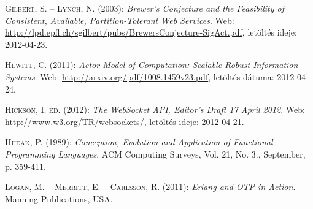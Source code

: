 \documentclass[12pt, a4paper, oneside]{book}
\begin{document}
\begin{thebibliography}{9}
{\scshape Gilbert, S. -- Lynch, N.} (2003): \emph{Brewer’s Conjecture and the
Feasibility of Consistent, Available, Partition-Tolerant Web Services}. Web:
\url{http://lpd.epfl.ch/sgilbert/pubs/BrewersConjecture-SigAct.pdf}, letöltés
ideje: 2012-04-23.

{\scshape Hewitt, C.} (2011): \emph{Actor Model of Computation: Scalable Robust
Information Systems}. Web: \url{http://arxiv.org/pdf/1008.1459v23.pdf},
letöltés dátuma: 2012-04-24.

{\scshape Hickson, I. ed.} (2012): \emph{The WebSocket API, Editor's Draft 17
April 2012}. Web: \url{http://www.w3.org/TR/websockets/}, letöltés ideje:
2012-04-21.

{\scshape Hudak, P.} (1989): \emph{Conception, Evolution and Application of Functional
Programming Languages}. ACM Computing Surveys, Vol. 21, No. 3., September, p.
359-411.

{\scshape Logan, M. -- Merritt, E. -- Carlsson, R.} (2011): \emph{Erlang and OTP in Action}.
Manning Publications, USA.

\end{thebibliography}

\clearpage
{}
\printindex
\end{document}
